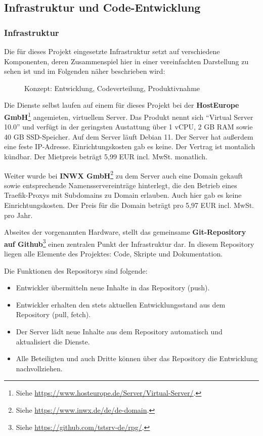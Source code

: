 
\subsection{Infrastruktur und Code-Entwicklung}


\subsubsection{Infrastruktur}

Die für dieses Projekt eingesetzte Infrastruktur setzt auf verschiedene Komponenten, deren Zusammenspiel hier in einer vereinfachten Darstellung zu sehen ist und im Folgenden näher beschrieben wird: 

\begin{figure}[H]
    \centering
    \label{fig:henning-dia-git-dev-server}
    \caption{Konzept: Entwicklung, Codeverteilung, Produktivnahme}
\end{figure}


Die Dienste selbst laufen auf einem für dieses Projekt bei der \textbf{HostEurope GmbH}\footnote{Siehe \url{https://www.hosteurope.de/Server/Virtual-Server/}.} angemieten, virtuellem Server. Das Produkt nennt sich \enquote{Virtual Server 10.0} und verfügt in der geringsten Austattung über 1 vCPU, 2 GB RAM sowie 40 GB SSD-Speicher. Auf dem Server läuft Debian 11. Der Server hat außerdem eine feste IP-Adresse. Einrichtungskosten gab es keine. Der Vertrag ist montalich kündbar. Der Mietpreis beträgt 5,99 EUR incl. MwSt. monatlich.

Weiter wurde bei \textbf{INWX GmbH}\footnote{Siehe \url{https://www.inwx.de/de/de-domain}.} zu dem Server auch eine Domain gekauft sowie entsprechende Namensservereinträge hinterlegt, die den Betrieb eines Traefik-Proxys mit Subdomains zu Domain erlauben. Auch hier gab es keine Einrichtungskosten. Der Preis für die Domain beträgt pro 5,97 EUR incl. MwSt. pro Jahr. 


Abseites der vorgenannten Hardware, stellt das gemeinsame \textbf{Git-Repository auf Github}\footnote{Siehe \url{https://github.com/tstsrv-de/rpg/}.} einen zentralen Punkt der Infrastruktur dar. In diesem Repository liegen alle Elemente des Projektes: Code, Skripte und Dokumentation.

Die Funktionen des Repositorys sind folgende: \begin{itemize}
    \item Entwickler übermitteln neue Inhalte in das Repository (push).
    \item Entwickler erhalten den stets aktuellen Entwicklungsstand aus dem Repository (pull, fetch).
    \item Der Server lädt neue Inhalte aus dem Repository automatisch und aktualisiert die Dienste.
    \item Alle Beteiligten und auch Dritte können über das Repository die Entwicklung nachvollziehen. 
\end{itemize}


